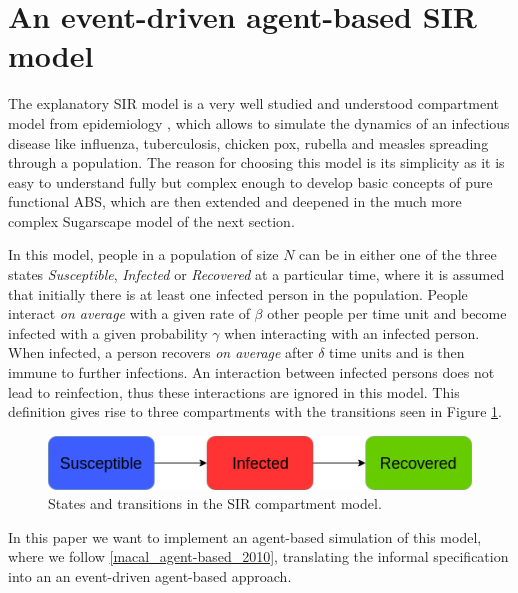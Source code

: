 \section{An event-driven agent-based SIR model}
\label{sec:sirmodel}
The explanatory SIR model is a very well studied and understood compartment model from epidemiology \cite{kermack_contribution_1927}, which allows to simulate the dynamics of an infectious disease like influenza, tuberculosis, chicken pox, rubella and measles spreading through a population. The reason for choosing this model is its simplicity as it is easy to understand fully but complex enough to develop basic concepts of pure functional ABS, which are then extended and deepened in the much more complex Sugarscape model of the next section.

In this model, people in a population of size $N$ can be in either one of the three states \textit{Susceptible}, \textit{Infected} or \textit{Recovered} at a particular time, where it is assumed that initially there is at least one infected person in the population. People interact \textit{on average} with a given rate of $\beta$ other people per time unit and become infected with a given probability $\gamma$ when interacting with an infected person. When infected, a person recovers \textit{on average} after $\delta$ time units and is then immune to further infections. An interaction between infected persons does not lead to reinfection, thus these interactions are ignored in this model. This definition gives rise to three compartments with the transitions seen in Figure \ref{fig:sir_transitions}.

\begin{figure}
	\centering
	\includegraphics[width=.7\textwidth, angle=0]{./fig/SIR_transitions.png}
	\caption{States and transitions in the SIR compartment model.}
	\label{fig:sir_transitions}
\end{figure}

In this paper we want to implement an agent-based simulation of this model, where we follow \ref{macal_agent-based_2010}, translating the informal specification into an an event-driven agent-based approach. 

